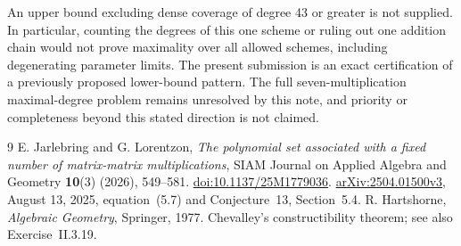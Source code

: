 \documentclass[11pt]{article}
\begin{document}
An upper bound excluding dense coverage of degree 43 or greater is not supplied. In particular, counting the degrees of this one scheme or ruling out one addition chain would not prove maximality over all allowed schemes, including degenerating parameter limits. The present submission is an exact certification of a previously proposed lower-bound pattern. The full seven-multiplication maximal-degree problem remains unresolved by this note, and priority or completeness beyond this stated direction is not claimed.

\begin{thebibliography}{9}
E. Jarlebring and G. Lorentzon,
\emph{The polynomial set associated with a fixed number of matrix-matrix multiplications},
SIAM Journal on Applied Algebra and Geometry \textbf{10}(3) (2026), 549--581.
\href{https://doi.org/10.1137/25M1779036}{doi:10.1137/25M1779036}.
\href{https://arxiv.org/abs/2504.01500}{arXiv:2504.01500v3}, August 13, 2025,
equation~(5.7) and Conjecture~13, Section~5.4.
R. Hartshorne, \emph{Algebraic Geometry}, Springer, 1977.
Chevalley's constructibility theorem; see also Exercise~II.3.19.
\end{thebibliography}
\end{document}
